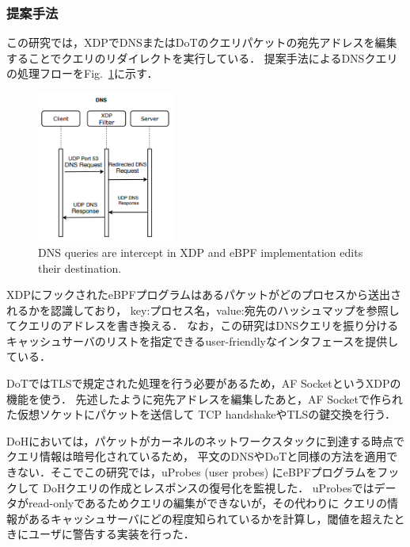 \documentclass[platex,a4j,10pt,twoside,twocolumn,dvipdfmx]{jsarticle}
\newcommand{\Fref}[1]{Fig.~\ref{#1}}
\begin{document}
\subsubsection{提案手法}
この研究では，XDPでDNSまたはDoTのクエリパケットの宛先アドレスを編集することでクエリのリダイレクトを実行している．
提案手法によるDNSクエリの処理フローを\Fref{img:dns-process}に示す．
\begin{figure}[tp]
  \begin{center}
    \includegraphics[width=45mm]{./img/dns-process.png}
  \end{center}
  \caption{DNS queries are intercept in XDP and eBPF implementation edits their destination. \cite{rivera2020leveraging}}
  \label{img:dns-process}
\end{figure}
XDPにフックされたeBPFプログラムはあるパケットがどのプロセスから送出されるかを認識しており，
key:プロセス名，value:宛先のハッシュマップを参照してクエリのアドレスを書き換える．
なお，この研究はDNSクエリを振り分けるキャッシュサーバのリストを指定できるuser-friendlyなインタフェースを提供している．

DoTではTLSで規定された処理を行う必要があるため，AF SocketというXDPの機能を使う．
先述したように宛先アドレスを編集したあと，AF Socketで作られた仮想ソケットにパケットを送信して
TCP handshakeやTLSの鍵交換を行う．

DoHにおいては，パケットがカーネルのネットワークスタックに到達する時点でクエリ情報は暗号化されているため，
平文のDNSやDoTと同様の方法を適用できない．そこでこの研究では，uProbes (user probes) にeBPFプログラムをフックして
DoHクエリの作成とレスポンスの復号化を監視した．
uProbesではデータがread-onlyであるためクエリの編集ができないが，その代わりに
クエリの情報があるキャッシュサーバにどの程度知られているかを計算し，閾値を超えたときにユーザに警告する実装を行った．
\end{document}
